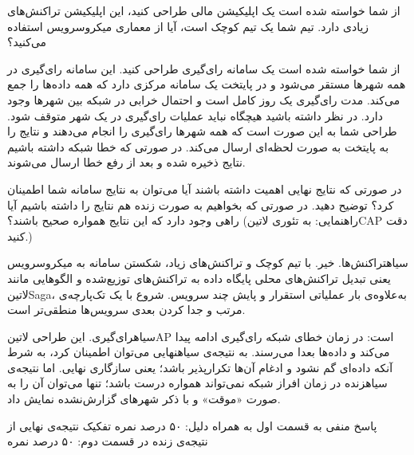 

از شما خواسته شده است یک اپلیکیشن مالی طراحی کنید، این اپلیکیشن تراکنش‌های زیادی دارد. تیم شما یک تیم کوچک است، آیا از معماری میکروسرویس استفاده می‌کنید؟


از شما خواسته شده است یک سامانه رای‌گیری طراحی کنید. این سامانه رای‌گیری در همه شهرها مستقر می‌شود و در پایتخت یک سامانه مرکزی دارد که همه داده‌ها را جمع می‌کند. مدت رای‌گیری یک روز کامل است و احتمال خرابی در شبکه بین شهرها وجود دارد. در نظر داشته باشید هیچگاه نباید عملیات رای‌گیری در یک شهر متوقف شود.
طراحی شما به این صورت است که همه شهرها رای‌گیری را انجام می‌دهند و نتایج را به پایتخت به صورت لحظه‌ای ارسال می‌کند. در صورتی که خطا شبکه داشته باشیم نتایج ذخیره شده و بعد از رفع خطا ارسال می‌شوند.

در صورتی که نتایج نهایی اهمیت داشته باشند آیا می‌توان به نتایج سامانه شما اطمینان کرد؟ توضیح دهید. در صورتی که بخواهیم به صورت زنده هم نتایج را داشته باشیم آیا راهی وجود دارد که این نتایج همواره صحیح باشند؟ (راهنمایی: به تئوری ‌لاتین{CAP} دقت کنید.)


\begin{پاسخ}

‌سیاه{تراکنش‌ها.} خیر.
با تیم کوچک و تراکنش‌های زیاد، شکستن سامانه به میکروسرویس یعنی تبدیل تراکنش‌های محلی پایگاه داده به تراکنش‌های توزیع‌شده و الگوهایی مانند ‌لاتین{Saga}،
به‌علاوه‌ی بار عملیاتی استقرار و پایش چند سرویس. شروع با یک تک‌پارچه‌ی مرتب و جدا کردن بعدی سرویس‌ها منطقی‌تر است.

‌سیاه{رای‌گیری.} این طراحی ‌لاتین{AP} است: در زمان خطای شبکه رای‌گیری ادامه پیدا می‌کند و داده‌ها بعدا می‌رسند.
به نتیجه‌ی ‌سیاه{نهایی} می‌توان اطمینان کرد، به شرط آنکه داده‌ای گم نشود و ادغام آن‌ها تکرارپذیر باشد؛ یعنی سازگاری نهایی.
اما نتیجه‌ی ‌سیاه{زنده} در زمان افراز شبکه نمی‌تواند همواره درست باشد؛ تنها می‌توان آن را به صورت «موقت» و با ذکر شهرهای گزارش‌نشده نمایش داد.

 پاسخ منفی به قسمت اول به همراه دلیل: ۵۰ درصد نمره
 تفکیک نتیجه‌ی نهایی از نتیجه‌ی زنده در قسمت دوم: ۵۰ درصد نمره

\end{پاسخ}
